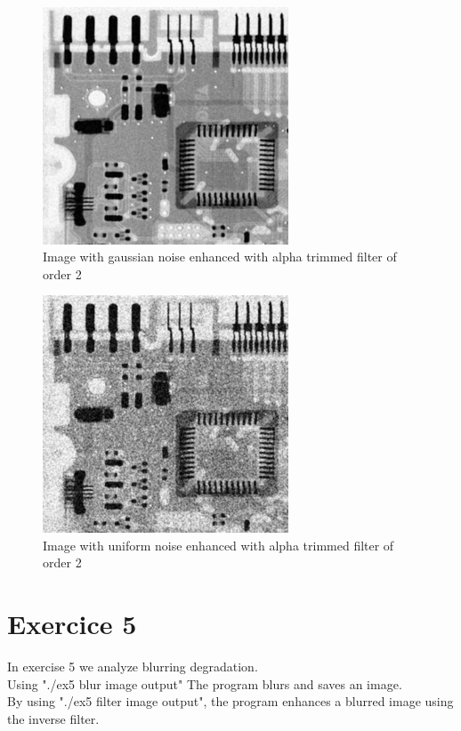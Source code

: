 \documentclass[10pt]{article}
\begin{document}
\begin{figure}[!ht]
	\centering
	\includegraphics[height=200pt]{./ex4/gaussalpha2.jpg}
	\caption{Image with gaussian noise enhanced with alpha trimmed filter of order 2}
\end{figure}
\begin{figure}[!ht]
	\centering
	\includegraphics[height=200pt]{./ex4/unialpha2.jpg}
	\caption{Image with uniform noise enhanced with alpha trimmed filter of order 2}
\end{figure}


\clearpage
\section{Exercice 5}
In exercise 5 we analyze blurring degradation.\\
Using "./ex5 blur image output" The program blurs and saves an image.\\
By using "./ex5 filter image output", the program enhances a blurred image using the inverse filter.
\end{document}
